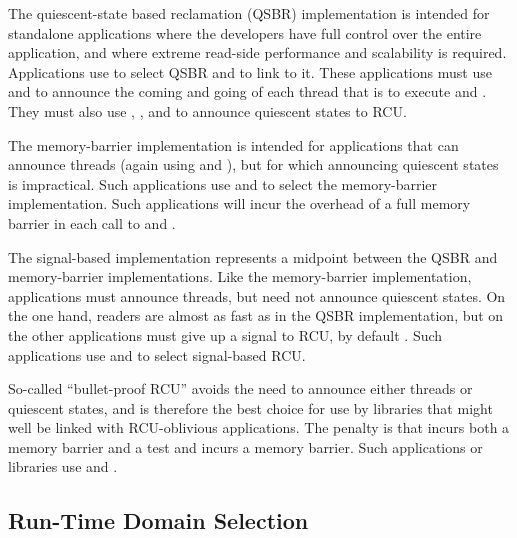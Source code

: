 \documentclass[letterpaper,10pt]{article}
\begin{document}
The quiescent-state based reclamation (QSBR) implementation is intended
for standalone applications where the developers have full control
over the entire application, and where extreme read-side performance
and scalability is required.
Applications use  to select QSBR and
 to link to it.
These applications must use  and
 to announce the coming and going
of each thread that is to execute  and
.
They must also use , ,
and  to announce quiescent states to RCU.

The memory-barrier implementation is intended for applications that
can announce threads (again using  and
), but for which announcing quiescent states is
impractical.
Such applications use  and
 to select the memory-barrier implementation.
Such applications will incur the overhead of a full memory barrier in
each call to  and .

The signal-based implementation represents a midpoint between the QSBR
and memory-barrier implementations.
Like the memory-barrier implementation, applications must announce
threads, but need not announce quiescent states.
On the one hand, readers are almost as fast as in the QSBR implementation,
but on the other applications must give up a signal to RCU, by default
.
Such applications use  and
 to select signal-based RCU.

So-called ``bullet-proof RCU'' avoids the need to announce either threads
or quiescent states, and is therefore the best choice for use by
libraries that might well be linked with RCU-oblivious applications.
The penalty is that  incurs both a memory barrier
and a test and  incurs a memory barrier.
Such applications or libraries use  and
.

\subsection{Run-Time Domain Selection}
\label{sec:Run-Time Domain Selection}
\end{document}
